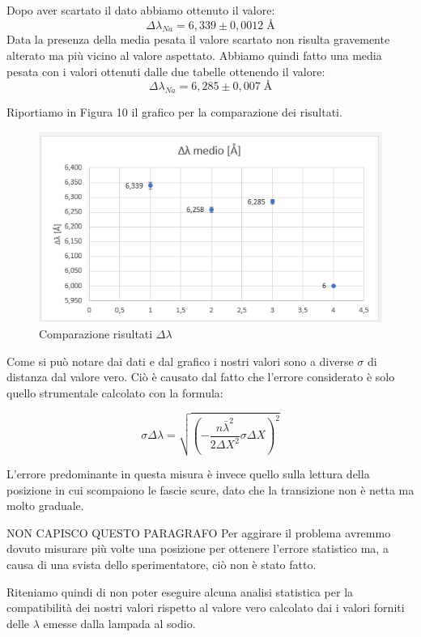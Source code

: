 \documentclass{article}
\begin{document}
\vspace{3mm}

Dopo aver scartato il dato abbiamo ottenuto il valore:
\[ \Delta \lambda_{Na} = 6,339 \pm 0,0012 \; \textrm{Å} \]
Data la presenza della media pesata il valore scartato non risulta gravemente alterato ma più vicino al valore aspettato.
Abbiamo quindi fatto una media pesata con i valori ottenuti dalle due tabelle ottenendo il valore:
\[ \Delta \lambda_{Na} = 6,285 \pm 0,007 \; \textrm{Å} \]

\clearpage
Riportiamo in Figura 10 il grafico per la comparazione dei risultati.


\begin{figure}[h!]
  \centering
  \includegraphics[width=0.6\linewidth]{IM grafico risultati delta lambda}
  \caption{Comparazione risultati $\Delta\lambda$}
\end{figure}


Come si può notare dai dati e dal grafico i nostri valori sono a diverse $\sigma$ di distanza dal valore vero. Ciò è causato dal fatto che l'errore considerato è solo quello strumentale calcolato con la formula:

\begin{equation} 
\sigma\Delta\lambda = \sqrt{ (- \frac{n {\bar \lambda}^2}{2 \Delta X^2} \sigma\Delta X)^2} 
\end{equation}

L'errore predominante in questa misura è invece quello sulla lettura della posizione in cui scompaiono le fascie scure, dato che la transizione non è netta ma molto graduale.

NON CAPISCO QUESTO PARAGRAFO 
Per aggirare il problema avremmo dovuto misurare più volte una posizione per ottenere l'errore statistico ma, a causa di una svista dello sperimentatore, ciò non è stato fatto. 

\vspace{3mm}

Riteniamo quindi di non poter eseguire alcuna analisi statistica per la compatibilità dei nostri valori rispetto al valore vero calcolato dai i valori forniti delle $\lambda$ emesse dalla lampada al sodio.
\end{document}
